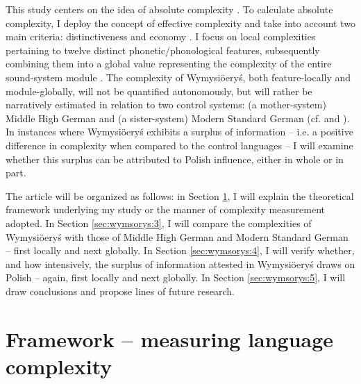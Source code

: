 \documentclass[output=paper,hidelinks]{langscibook}
\begin{document}
This study centers on the idea of absolute complexity \citep{kusters_complexity_2008, dahl_growth_2004, dahl_testing_2009, miestamo_grammatical_2008, miestamo_implicational_2009}. To calculate absolute complexity, I deploy the concept of effective complexity \citep{gell-mann_what_1995, gell-mann_effective_2004} %
and take into account two main criteria: distinctiveness and economy \citep{miestamo_complexity_2006, miestamo_grammatical_2008, sinnemaki_complexity_2008, sinnemaki_complexity_2009, sinnemaki_language_2011, parkvall_simplicity_2008}. I focus on local complexities pertaining to twelve distinct phonetic/phonological features, subsequently combining them into a global value representing the complexity of the entire sound-system module \citep{miestamo_complexity_2006, miestamo_feasibility_2006, miestamo_implicational_2009, deutscher_overall_2009, sinnemaki_complexity_2014}. The complexity of Wymysiöeryś, both feature-locally and module-globally, will not be quantified autonomously, but will rather be narratively estimated in relation to two control systems: (a mother-system) Middle High German and (a sister-system) Modern Standard German (cf. \citealt{deutscher_overall_2009} and \citealt{dahl_testing_2009}). In instances where Wymysiöeryś exhibits a surplus of information -- i.e. a positive difference in complexity when compared to the control languages -- I will examine whether this surplus can be attributed to Polish influence, either in whole or in part.

The article will be organized as follows: in Section \ref{sec:wymsorys:2}, I will explain the theoretical framework underlying my study or the manner of complexity measurement adopted. In Section \ref{sec:wymsorys:3}, I will compare the complexities of Wymysiöeryś with those of Middle High German and Modern Standard German – first locally and next globally. In Section \ref{sec:wymsorys:4}, I will verify whether, and how intensively, the surplus of information attested in Wymysiöeryś draws on Polish – again, first locally and next globally. In Section \ref{sec:wymsorys:5}, I will draw conclusions and propose lines of future research.

\section{Framework – measuring language complexity}\label{sec:wymsorys:2}
\end{document}
